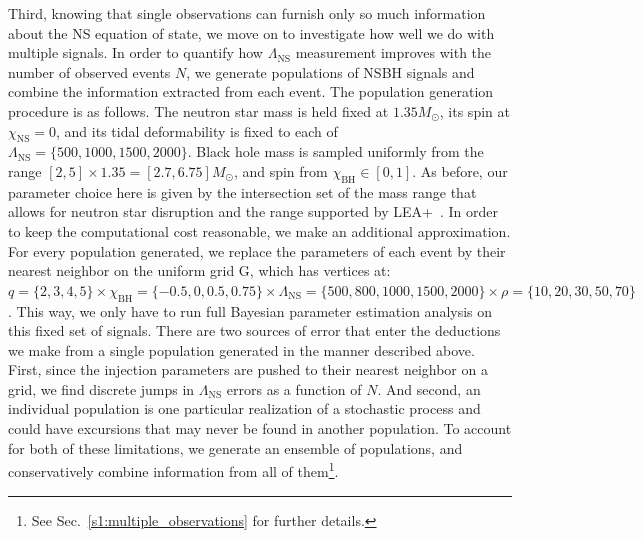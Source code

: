 \documentclass[aps,prd,amsmath,floats,floatfix, twocolumn,
superscriptaddress,nofootinbib,showpacs]{revtex4-1}
\newcommand{\lambdans}{\Lambda_\mathrm{NS}}
\newcommand{\chibh}{\chi_\mathrm{BH}}
\newcommand{\chins}{\chi_\mathrm{NS}}
\begin{document}
Third, knowing that single observations can furnish only so much information
about the NS equation of state, we move on to investigate how well we do with
multiple signals. In order to quantify how $\lambdans$ measurement improves
with the number of observed events $N$, we generate populations of NSBH signals
and combine the information extracted from each event.
% 
The population generation procedure is as follows. The neutron star mass is
held fixed at $1.35M_\odot$, its spin at $\chins=0$, and its tidal
deformability is fixed to each of $\lambdans=\{500,1000,1500,2000\}$. Black hole
mass is sampled uniformly from the range $[2,5]\times 1.35=[2.7, 6.75]M_\odot$,
and spin from $\chibh\in[0,1]$. As before, our parameter choice here is given
by the intersection set of the mass range that allows for neutron star disruption
and the range supported by LEA+~\cite{Foucart2012,Foucart:2013a,Lackey:2013axa}.
In order to keep the computational cost reasonable, we make an additional
approximation. For every population generated, we replace the parameters of each
event by their nearest neighbor on the uniform grid G, which has vertices
at: $q=\{2,3,4,5\}\times\chibh=\{-0.5,0,0.5,0.75\}\times\lambdans=\{500,800,
1000,1500,2000\}\times\rho=\{10,20,30,50,70\}$.
% 
This way, we only have to run full Bayesian parameter estimation analysis on
this fixed set of signals. 
% 
There are two sources of error that enter the deductions we make from
a single population generated in the manner described above. First, since the
injection parameters are pushed to their nearest neighbor on a grid, we
find discrete jumps in $\lambdans$ errors as a function of $N$. And second, an
individual population is one particular realization of a stochastic process and
could have excursions that may never be found in another population. To
account for both of these limitations, we generate an ensemble of populations,
and conservatively combine information from all of them\footnote{See 
Sec.~\ref{s1:multiple_observations} for further details.}.
\end{document}
